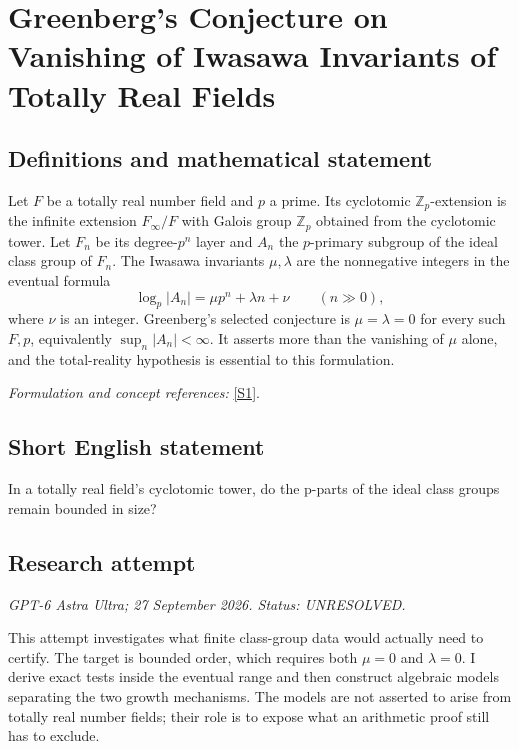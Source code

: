 \documentclass[11pt]{article}
\begin{document}
\section*{\texorpdfstring{Greenberg's Conjecture on Vanishing of Iwasawa Invariants of Totally Real Fields}{Greenberg's Conjecture on Vanishing of Iwasawa Invariants of Totally Real Fields}}\label{428}
\subsection{Definitions and mathematical statement}
Let $F$ be a totally real number field and $p$ a prime. Its cyclotomic ${\mathbb{Z}}_p$-extension is the infinite extension $F_\infty/F$ with Galois group ${\mathbb{Z}}_p$ obtained from the cyclotomic tower. Let $F_n$ be its degree-$p^n$ layer and $A_n$ the $p$-primary subgroup of the ideal class group of $F_n$. The Iwasawa invariants $\mu,\lambda$ are the nonnegative integers in the eventual formula
\[
 \log_p|A_n|=\mu p^n+\lambda n+\nu\qquad(n\gg0),
\]
where $\nu$ is an integer. Greenberg's selected conjecture is $\mu=\lambda=0$ for every such $F,p$, equivalently $\sup_n|A_n|<\infty$. It asserts more than the vanishing of $\mu$ alone, and the total-reality hypothesis is essential to this formulation.
\par\smallskip\textit{Formulation and concept references:} \href{https://arxiv.org/html/2503.15727v2}{[S1]}.

\subsection{Short English statement}
In a totally real field's cyclotomic tower, do the p-parts of the ideal class groups remain bounded in size?
\subsection{Research attempt}
\textit{GPT-6 Astra Ultra; 27 September 2026. Status: UNRESOLVED.}

This attempt investigates what finite class-group data would actually
need to certify. The target is bounded order, which requires both
$\mu=0$ and $\lambda=0$. I derive exact tests inside the eventual
range and then construct algebraic models separating the two growth
mechanisms. The models are not asserted to arise from totally real
number fields; their role is to expose what an arithmetic proof still
has to exclude.
\end{document}
